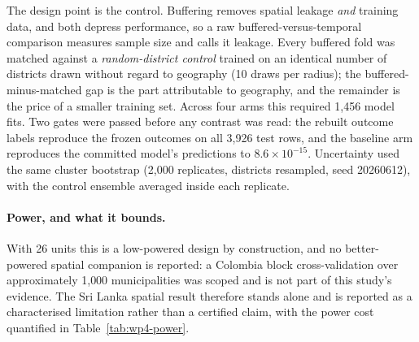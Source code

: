 \documentclass[11pt,a4paper]{article}
\begin{document}
The design point is the control. Buffering removes spatial leakage \emph{and} training data, and both depress performance, so a raw buffered-versus-temporal comparison measures sample size and calls it leakage. Every buffered fold was matched against a \emph{random-district control} trained on an identical number of districts drawn without regard to geography (10 draws per radius); the buffered-minus-matched gap is the part attributable to geography, and the remainder is the price of a smaller training set. Across four arms this required 1{,}456 model fits. Two gates were passed before any contrast was read: the rebuilt outcome labels reproduce the frozen outcomes on all 3{,}926 test rows, and the baseline arm reproduces the committed model's predictions to $8.6\times10^{-15}$. Uncertainty used the same cluster bootstrap (2{,}000 replicates, districts resampled, seed 20260612), with the control ensemble averaged inside each replicate.

\paragraph{Power, and what it bounds.} With 26 units this is a low-powered design by construction, and no better-powered spatial companion is reported: a Colombia block cross-validation over approximately 1{,}000 municipalities was scoped and is not part of this study's evidence. The Sri Lanka spatial result therefore stands alone and is reported as a characterised limitation rather than a certified claim, with the power cost quantified in Table~\ref{tab:wp4-power}.
\end{document}

